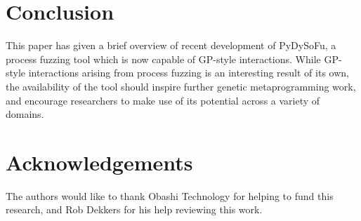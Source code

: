 \documentclass[12pt]{llncs} %
\begin{document}
\section{Conclusion}
This paper has given a brief overview of recent development of PyDySoFu, a
process fuzzing tool which is now capable of GP-style interactions. While
GP-style interactions arising from process fuzzing is an interesting result of
its own, the availability of the tool should inspire further genetic
metaprogramming work, and encourage researchers to make use of its
potential across a variety of domains.\par

\section*{Acknowledgements}
\label{sec:ack}
The authors would like to thank Obashi Technology for helping to fund this
research, and Rob Dekkers for his help reviewing this work.



\end{document}
